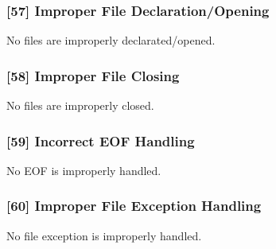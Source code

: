 \subsubsection{[57] Improper File Declaration/Opening}
No files are improperly declarated/opened.

\subsubsection{[58] Improper File Closing}
No files are improperly closed.

\subsubsection{[59] Incorrect EOF Handling}
No EOF is improperly handled.

\subsubsection{[60] Improper File Exception Handling}
No file exception is improperly handled.
